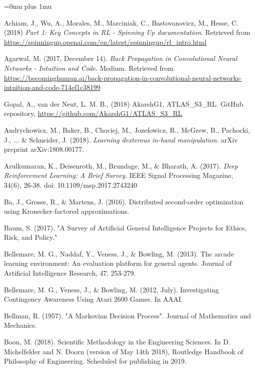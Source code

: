 \Urlmuskip=0mu plus 1mu\relax
\begin{thebibliography}{99} %

\bibitem{} Achiam, J., Wu, A., Morales, M., Marciniak, C., Bastovanovicz, M., Hesse, C. (2018) \textit{Part 1: Key Concepts in RL - Spinning Up documentation}. Retrieved from \url{https://spinningup.openai.com/en/latest/spinningup/rl\_intro.html}

\bibitem{} Agarwal, M. (2017, December 14). \textit{Back Propagation in Convolutional Neural Networks -
Intuition and Code}. Medium. Retrieved from \url{https://becominghuman.ai/back-propagation-in-convolutional-neural-networks-intuition-and-code-714ef1c38199}

\bibitem{} Gopal, A., van der Neut, L. M. B., (2018) AkarshG1, ATLAS\_S3\_RL. GitHub repository,
\url{https://github.com/AkarshG1/ATLAS\_S3\_RL}

\bibitem{} Andrychowicz, M., Baker, B., Chociej, M., Jozefowicz, R., McGrew, B., Pachocki, J., ... \& Schneider, J. (2018). \textit{Learning dexterous in-hand manipulation}. arXiv preprint arXiv:1808.00177.

\bibitem{} Arulkumaran, K., Deisenroth, M., Brundage, M., \& Bharath, A. (2017). \textit{Deep Reinforcement Learning: A Brief Survey}. IEEE Signal Processing Magazine, 34(6), 26-38. doi: 10.1109/msp.2017.2743240

\bibitem{} Ba, J., Grosse, R., \& Martens, J. (2016). Distributed second-order optimization using Kronecker-factored approximations.

\bibitem{} Baum, S. (2017). "A Survey of Artificial General Intelligence Projects for Ethics, Risk, and Policy." 

\bibitem{} Bellemare, M. G., Naddaf, Y., Veness, J., \& Bowling, M. (2013). The arcade learning
environment: An evaluation platform for general agents. Journal of Artificial Intelligence Research, 47, 253-279.

\bibitem{} Bellemare, M. G., Veness, J., \& Bowling, M. (2012, July). Investigating Contingency Awareness Using Atari 2600 Games. In AAAI.

\bibitem{} Bellman, R. (1957). "A Markovian Decision Process". Journal of Mathematics and Mechanics.

\bibitem{} Boon, M. (2018). Scientific Methodology in the Engineering Sciences. In D. Michelfelder and N. Doorn (version of May 14th 2018), Routledge Handbook of Philosophy of Engineering. Scheduled for publishing in 2019.


\end{thebibliography}

